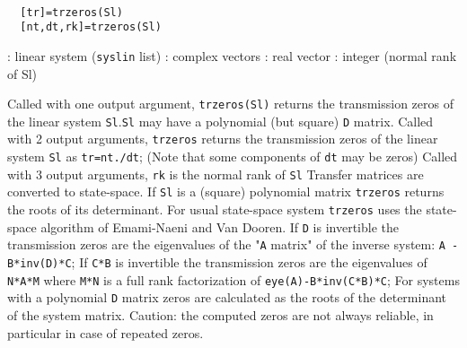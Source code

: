%
% 
%



\begin{mandesc}
   \\ %
\end{mandesc}
\begin{calling_sequence}
\begin{verbatim}
  [tr]=trzeros(Sl)  
  [nt,dt,rk]=trzeros(Sl)  
\end{verbatim}
\end{calling_sequence}
\begin{parameters}
  \begin{varlist}
    : linear system (\verb!syslin! list)
    : complex vectors
    : real vector
    : integer (normal rank of Sl)
  \end{varlist}
\end{parameters}
\begin{mandescription}
  Called with one output argument, \verb!trzeros(Sl)! returns the 
  transmission zeros of the linear system \verb!Sl!.\verb!Sl! may have a polynomial (but square) \verb!D! matrix.
  Called with 2 output arguments, \verb!trzeros! returns the 
  transmission zeros of the linear system \verb!Sl! as \verb!tr=nt./dt!;
  (Note that some components of \verb!dt! may be zeros)
  Called with 3 output arguments, \verb!rk!  is the normal rank of \verb!Sl!
  Transfer matrices are converted to state-space.
  If \verb!Sl! is a (square) polynomial matrix \verb!trzeros! returns the 
  roots of its determinant.
  For usual state-space system \verb!trzeros! uses the state-space 
  algorithm of Emami-Naeni and Van Dooren.
  If \verb!D! is invertible the transmission zeros are the eigenvalues
  of the "\verb!A! matrix" of the inverse system: \verb!A - B*inv(D)*C!;
  If \verb!C*B! is invertible the transmission zeros are the eigenvalues
  of \verb!N*A*M! where \verb!M*N! is a full rank factorization of 
  \verb!eye(A)-B*inv(C*B)*C!;
  For systems with a polynomial \verb!D! matrix zeros are 
  calculated as the roots of the determinant of the system matrix.
  Caution: the computed zeros are not always reliable, in particular
  in case of repeated zeros.
\end{mandescription}
